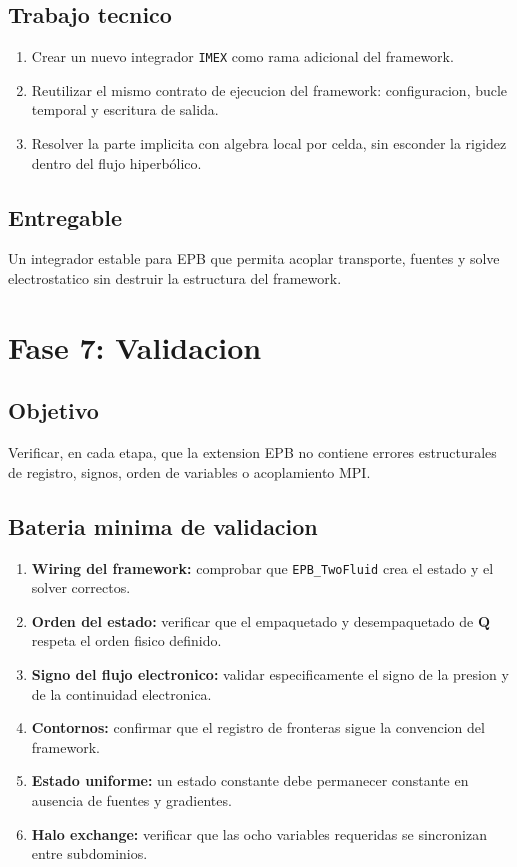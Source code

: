 \documentclass[11pt]{article}
\begin{document}
\subsection*{Trabajo tecnico}

\begin{enumerate}[label=\arabic*.]
    \item Crear un nuevo integrador \texttt{IMEX} como rama adicional del framework.
    \item Reutilizar el mismo contrato de ejecucion del framework: configuracion, bucle temporal y escritura de salida.
    \item Resolver la parte implicita con algebra local por celda, sin esconder la rigidez dentro del flujo hiperb\'olico.
\end{enumerate}

\subsection*{Entregable}

Un integrador estable para EPB que permita acoplar transporte, fuentes y solve electrostatico sin destruir la estructura del framework.

\section{Fase 7: Validacion}

\subsection*{Objetivo}

Verificar, en cada etapa, que la extension EPB no contiene errores estructurales de registro, signos, orden de variables o acoplamiento MPI.

\subsection*{Bateria minima de validacion}

\begin{enumerate}[label=\arabic*.]
    \item \textbf{Wiring del framework:} comprobar que \texttt{EPB\_TwoFluid} crea el estado y el solver correctos.
    \item \textbf{Orden del estado:} verificar que el empaquetado y desempaquetado de $\mathbf{Q}$ respeta el orden fisico definido.
    \item \textbf{Signo del flujo electronico:} validar especificamente el signo de la presion y de la continuidad electronica.
    \item \textbf{Contornos:} confirmar que el registro de fronteras sigue la convencion del framework.
    \item \textbf{Estado uniforme:} un estado constante debe permanecer constante en ausencia de fuentes y gradientes.
    \item \textbf{Halo exchange:} verificar que las ocho variables requeridas se sincronizan entre subdominios.
\end{enumerate}
\end{document}
